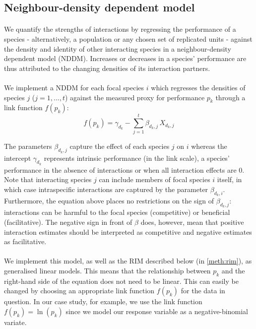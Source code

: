 \documentclass[a4,12pt]{article}
\begin{document}
    \subsection{Neighbour-density dependent model}
    \label{meth:nddm}    

        \paragraph{}
        We quantify the strengths of interactions by regressing the performance of a species  - alternatively, a population or any chosen set of replicated units - against the density and identity of other interacting species in a neighbour-density dependent model (NDDM).  Increases or decreases in a species' performance are thus attributed to the changing densities of its interaction partners. 

        \paragraph{}
        We implement a NDDM for each focal species $i$ which regresses the densities of species $j$ ($j = 1, ..., t$) against the measured proxy for performance $p_{k}$ through a link function $f(p_k)$:
        \begin{equation}
        f(p_{k}) = \gamma_{d_k} - \sum_{j=1}^{t} \beta_{d_k,j} \, X_{d_k,j}
        \label{nddm}
        \end{equation}

        The parameters $\beta_{d_k,j}$ capture the effect of each species $j$ on $i$ whereas the intercept $\gamma_{d_k}$ represents intrinsic performance (in the link scale), a species' performance in the absence of interactions or when all interaction effects are $0$. Note that interacting species $j$ can include members of focal species $i$ itself, in which case intraspecific interactions are captured by the parameter $\beta_{d_k,i}$. Furthermore, the equation above places no restrictions on the sign of $\beta_{d_k, j}$: interactions can be harmful to the focal species (competitive) or beneficial (facilitative). The negative sign in front of $\beta$ does, however, mean that positive interaction estimates should be interpreted as competitive and negative estimates as facilitative.

        \paragraph{}
        We implement this model, as well as the RIM described below (in \ref{meth:rim}), as generalised linear models. This means that the relationship between $p_k$ and the right-hand side of the equation does not need to be linear. This can easily be changed by choosing an appropriate link function $f(p_k)$ for the data in question. In our case study, for example, we use the link function $f(p_k) = \ln(p_k)$ since we model our response variable as a negative-binomial variate.
              
\end{document}
